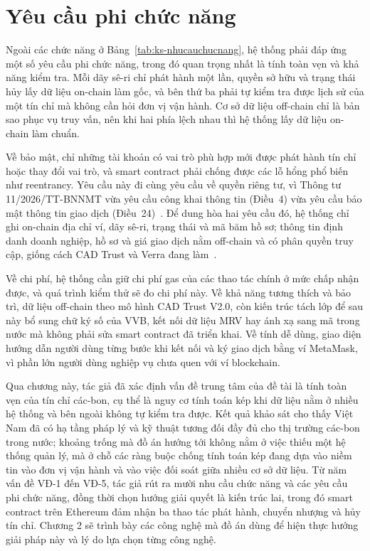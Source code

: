 \section{Yêu cầu phi chức năng}
\label{sec:phichucnang}
\label{subsec:ycphichucnang}

Ngoài các chức năng ở Bảng~\ref{tab:ks-nhucauchucnang}, hệ thống phải đáp ứng một số yêu cầu phi chức năng, trong đó quan trọng nhất là tính toàn vẹn và khả năng kiểm tra. Mỗi dãy sê-ri chỉ phát hành một lần, quyền sở hữu và trạng thái hủy lấy dữ liệu on-chain làm gốc, và bên thứ ba phải tự kiểm tra được lịch sử của một tín chỉ mà không cần hỏi đơn vị vận hành. Cơ sở dữ liệu off-chain chỉ là bản sao phục vụ truy vấn, nên khi hai phía lệch nhau thì hệ thống lấy dữ liệu on-chain làm chuẩn.

Về bảo mật, chỉ những tài khoản có vai trò phù hợp mới được phát hành tín chỉ hoặc thay đổi vai trò, và smart contract phải chống được các lỗ hổng phổ biến như reentrancy. Yêu cầu này đi cùng yêu cầu về quyền riêng tư, vì Thông tư 11/2026/TT-BNNMT vừa yêu cầu công khai thông tin (Điều~4) vừa yêu cầu bảo mật thông tin giao dịch (Điều~24)~\cite{vietnam2026thongtu11}. Để dung hòa hai yêu cầu đó, hệ thống chỉ ghi on-chain địa chỉ ví, dãy sê-ri, trạng thái và mã băm hồ sơ; thông tin định danh doanh nghiệp, hồ sơ và giá giao dịch nằm off-chain và có phân quyền truy cập, giống cách CAD Trust và Verra đang làm~\cite{cadtrust2025datamodel,verra2020registryv2}.

Về chi phí, hệ thống cần giữ chi phí gas của các thao tác chính ở mức chấp nhận được, và quá trình kiểm thử sẽ đo chi phí này. Về khả năng tương thích và bảo trì, dữ liệu off-chain theo mô hình CAD Trust V2.0, còn kiến trúc tách lớp để sau này bổ sung chữ ký số của VVB, kết nối dữ liệu MRV hay ánh xạ sang mã trong nước mà không phải sửa smart contract đã triển khai. Về tính dễ dùng, giao diện hướng dẫn người dùng từng bước khi kết nối và ký giao dịch bằng ví MetaMask, vì phần lớn người dùng nghiệp vụ chưa quen với ví blockchain.

Qua chương này, tác giả đã xác định vấn đề trung tâm của đề tài là tính toàn vẹn của tín chỉ các-bon, cụ thể là nguy cơ tính toán kép khi dữ liệu nằm ở nhiều hệ thống và bên ngoài không tự kiểm tra được. Kết quả khảo sát cho thấy Việt Nam đã có hạ tầng pháp lý và kỹ thuật tương đối đầy đủ cho thị trường các-bon trong nước; khoảng trống mà đồ án hướng tới không nằm ở việc thiếu một hệ thống quản lý, mà ở chỗ các ràng buộc chống tính toán kép đang dựa vào niềm tin vào đơn vị vận hành và vào việc đối soát giữa nhiều cơ sở dữ liệu. Từ năm vấn đề VĐ-1 đến VĐ-5, tác giả rút ra mười nhu cầu chức năng và các yêu cầu phi chức năng, đồng thời chọn hướng giải quyết là kiến trúc lai, trong đó smart contract trên Ethereum đảm nhận ba thao tác phát hành, chuyển nhượng và hủy tín chỉ. Chương 2 sẽ trình bày các công nghệ mà đồ án dùng để hiện thực hướng giải pháp này và lý do lựa chọn từng công nghệ.
